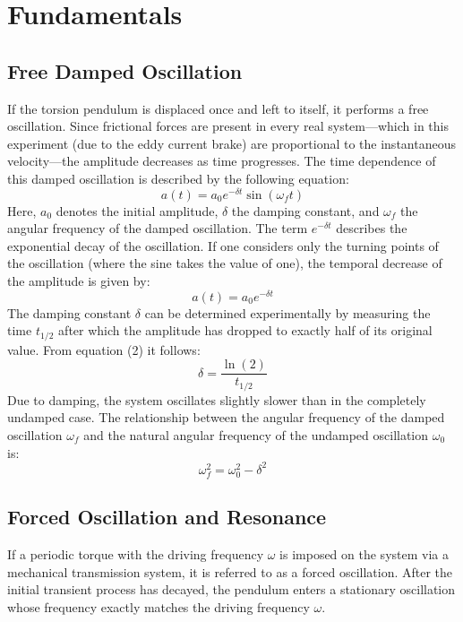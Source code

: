 \documentclass[12pt,a4paper,titlepage]{scrartcl}
\numberwithin{equation}{section}
\numberwithin{table}{section}
\numberwithin{figure}{section}
\begin{document}
\section{Fundamentals}\label{fundamentals}

\subsection{Free Damped Oscillation}
If the torsion pendulum is displaced once and left to itself, it performs a free oscillation. Since frictional forces are present in every real system—which in this experiment (due to the eddy current brake) are proportional to the instantaneous velocity—the amplitude decreases as time progresses. The time dependence of this damped oscillation is described by the following equation:
\begin{equation}
    a(t) = a_0 e^{-\delta t} \sin(\omega_f t)
\end{equation}
Here, $a_0$ denotes the initial amplitude, $\delta$ the damping constant, and $\omega_f$ the angular frequency of the damped oscillation. The term $e^{-\delta t}$ describes the exponential decay of the oscillation. If one considers only the turning points of the oscillation (where the sine takes the value of one), the temporal decrease of the amplitude is given by:
\begin{equation}
    a(t) = a_0 e^{-\delta t}
\end{equation}
The damping constant $\delta$ can be determined experimentally by measuring the time $t_{1/2}$ after which the amplitude has dropped to exactly half of its original value. From equation (2) it follows:
\begin{equation}
    \delta = \frac{\ln(2)}{t_{1/2}}
\end{equation}
Due to damping, the system oscillates slightly slower than in the completely undamped case. The relationship between the angular frequency of the damped oscillation $\omega_f$ and the natural angular frequency of the undamped oscillation $\omega_0$ is:
\begin{equation}
    \omega_f^2 = \omega_0^2 - \delta^2
\end{equation}

\subsection{Forced Oscillation and Resonance}
If a periodic torque with the driving frequency $\omega$ is imposed on the system via a mechanical transmission system, it is referred to as a forced oscillation. After the initial transient process has decayed, the pendulum enters a stationary oscillation whose frequency exactly matches the driving frequency $\omega$. 
\end{document}
